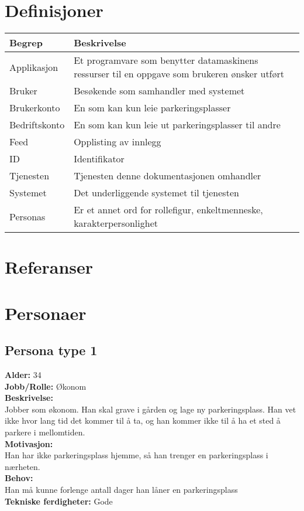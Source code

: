 \documentclass[12pt]{article}
\begin{document}
\section{Definisjoner}

\begin{center}
    \begin{tabular}{|p{4cm}|p{12cm}| } 
        \hline
        \bf Begrep & \bf Beskrivelse \\
        \hline
        Applikasjon &  Et programvare som benytter datamaskinens ressurser til en oppgave som brukeren ønsker utført \\
        \hline
        Bruker & Besøkende som samhandler med systemet \\
        \hline
        Brukerkonto & En som kan kun leie parkeringsplasser \\
        \hline
        Bedriftskonto & En som kan kun leie ut parkeringsplasser til andre \\
        \hline
        Feed & Opplisting av innlegg \\
        \hline
        ID & Identifikator \\
        \hline
        Tjenesten & Tjenesten denne dokumentasjonen omhandler \\
        \hline
        Systemet & Det underliggende systemet til tjenesten \\
        \hline
        Personas & Er et annet ord for rollefigur, enkeltmenneske, karakterpersonlighet\\
        \hline
    \end{tabular}
\end{center}

\section{Referanser}

\section{Personaer}

    \subsection{Persona type 1}
    \textbf{Alder:} 34 \\\textbf{Jobb/Rolle:} Økonom\\\textbf{Beskrivelse:}\\Jobber som økonom. Han skal grave i gården og lage ny parkeringsplass. Han vet ikke hvor lang tid det kommer til å ta, og han kommer ikke til å ha et sted å parkere i mellomtiden.\\\textbf{Motivasjon:}\\Han har ikke parkeringsplass hjemme, så han trenger en parkeringsplass i nærheten.\\\textbf{Behov:}\\Han må kunne forlenge antall dager han låner en parkeringsplass\\\textbf{Tekniske ferdigheter:} Gode
\end{document}
